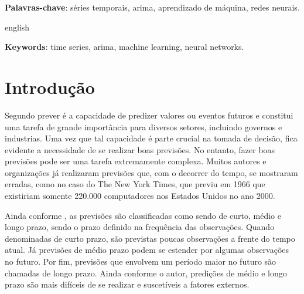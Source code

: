 \documentclass[
    12pt,
    oneside,
    a4paper,
    english,
    brazil
]{abntex2}
\begin{document}
\frenchspacing

\imprimircapa{}

\imprimirfolhaderosto{}

\begin{resumo}

    \textbf{Palavras-chave}: séries temporais, arima, aprendizado de máquina,
    redes neurais.
\end{resumo}

\begin{resumo}[Abstract]
    \begin{otherlanguage*}{english}

        \textbf{Keywords}: time series, arima, machine learning, neural
        networks.
    \end{otherlanguage*}
\end{resumo}

\textual{}

\tableofcontents*
\cleardoublepage{}

\chapter{Introdução}


Segundo  prever é a capacidade de predizer valores ou eventos
futuros e  constitui uma  tarefa de grande  importância para  diversos setores,
incluindo governos e industrias. Uma vez  que tal capacidade é parte crucial na
tomada de decisão,  fica evidente a necessidade de se  realizar boas previsões.
No entanto,  fazer boas  previsões pode ser  uma tarefa  extremamente complexa.
Muitos autores  e organizações já realizaram  previsões que, com o  decorrer do
tempo, se mostraram erradas, como no caso  do The New York Times, que previu em
1966  que existiriam  somente 220.000  computadores nos  Estados Unidos  no ano
2000.

Ainda conforme  , as  previsões são classificadas  como sendo
de  curto,  médio  e  longo  prazo,   sendo  o  prazo  definido  na  frequência
das  observações.  Quando denominadas  de  curto  prazo, são  previstas  poucas
observações  a frente  do tempo  atual. Já  previsões de  médio prazo  podem se
estender por algumas observações no futuro.  Por fim, previsões que envolvem um
período maior  no futuro são chamadas  de longo prazo. Ainda  conforme o autor,
predições de médio e longo prazo são mais difíceis de se realizar e suscetíveis
a fatores externos.
\end{document}
